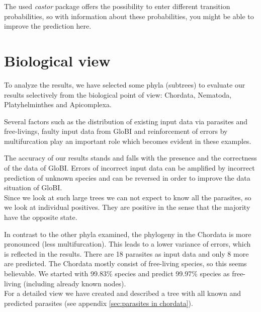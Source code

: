 
    The used \textit{castor} package \cite{Louca2017} offers the possibility to enter different transition 
      probabilities, so with information about these probabilities, you might be able to improve the 
      prediction here.

  \section{Biological view}
    To analyze the results, we have selected some phyla (subtrees) to evaluate our results selectively 
      from the biological point of view: Chordata, Nematoda, Platyhelminthes and Apicomplexa.

    Several factors such as the distribution of existing input data via parasites and free-livings, 
      faulty input data from GloBI and reinforcement of errors by multifurcation play an important 
      role which becomes evident in these examples.

    The accuracy of our results stands and falls with the presence and the correctness of the data of 
      GloBI. Errors of incorrect input data can be amplified by incorrect prediction of unknown 
      species and can be reversed in order to improve the data situation of GloBI. \\
    Since we look at such large trees we can not expect to know all the parasites, so we look at 
      individual positives. They are positive in the sense that the majority have the opposite state.

    In contrast to the other phyla examined, the phylogeny in the Chordata is more pronounced (less 
      multifurcation). This leads to a lower variance of errors, which is reflected in the results. 
      There are 18 parasites as input data and only 8 more are predicted. The Chordata mostly consist 
      of free-living species, so this seems believable. We started with 99.83\%  species and predict 
      99.97\% species as free-living (including already known nodes). \\
    For a detailed view we have created and described a tree with all known and predicted parasites 
      (see appendix \ref{sec:parasites in chordata}).

